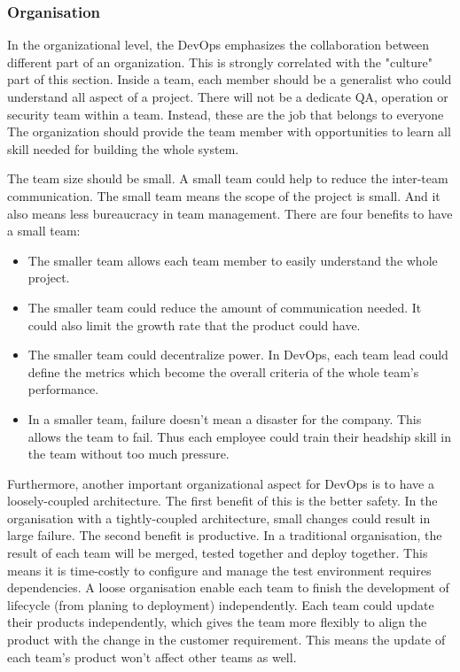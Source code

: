\subsubsection[]{Organisation}
In the organizational level, the DevOps emphasizes the collaboration between different part of an organization. This is strongly correlated with the "culture" part of this section. Inside a team, each member should be a generalist who could understand all aspect of a project. There will not be a dedicate QA, operation or security team within a team. Instead, these are the job that belongs to everyone\cite{feitelson2013development}\cite{kim2016devops} The organization should provide the team member with opportunities to learn all skill needed for building the whole system. 
\par
The team size should be small. A small team could help to reduce the inter-team communication. The small team means the scope of the project is small. And it also means less bureaucracy in team management. There are four benefits to have a small team:\cite{kim2016devops}
\begin{itemize}
    \item The smaller team allows each team member to easily understand the whole project.
    \item The smaller team could reduce the amount of communication needed. It could also limit the growth rate that the product could have.
    \item The smaller team could decentralize power. In DevOps, each team lead could define the metrics which become the overall criteria of the whole team's performance.\cite{kim2016devops} 
    \item In a smaller team, failure doesn't mean a disaster for the company. This allows the team to fail. Thus each employee could train their headship skill in the team without too much pressure. 
\end{itemize} 
\par
Furthermore, another important organizational aspect for DevOps is to have a loosely-coupled architecture. 
The first benefit of this is the better safety.
In the organisation with a tightly-coupled architecture, small changes could result in large failure.\cite{kim2016devops} 
The second benefit is productive. In a traditional organisation, the result of each team will be merged, tested together and deploy together. This means it is time-costly to configure and manage the test environment requires dependencies. A loose organisation enable each team to finish the development of lifecycle (from planing to deployment) independently. Each team could update their products independently, which gives the team more flexibly to align the product with the change in the customer requirement. This means the update of each team's product won't affect other teams as well.
